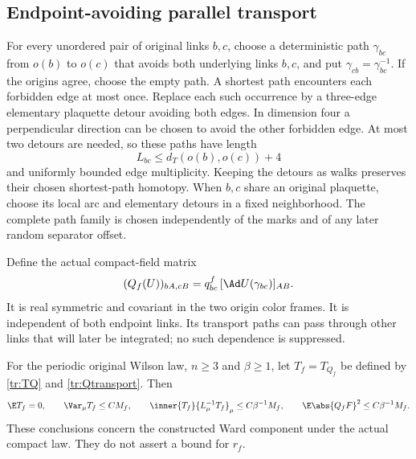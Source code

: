 \subsection{Endpoint-avoiding parallel transport}

For every unordered pair of original links \(b,c\), choose a deterministic
path \(\gamma_{bc}\) from \(o(b)\) to \(o(c)\) that avoids both underlying
links \(b,c\), and put \(\gamma_{cb}=\gamma_{bc}^{-1}\). If the origins agree,
choose the empty path. A shortest path encounters each forbidden edge at most
once. Replace each such occurrence by a three-edge elementary plaquette
detour avoiding both edges. In dimension four a perpendicular direction can
be chosen to avoid the other forbidden edge. At most two detours are needed,
so these paths have length
\begin{equation}
 L_{bc}\le d_T(o(b),o(c))+4
 \label{tr:pathlength}
\end{equation}
and uniformly bounded edge multiplicity. Keeping the detours as walks
preserves their chosen shortest-path homotopy. When \(b,c\) share an original
plaquette, choose its local arc and elementary detours in a fixed neighborhood.
The complete path family is chosen independently of the marks and of any
later random separator offset.

Define the actual compact-field matrix
\begin{equation}
 (Q_f(U))_{bA,cB}
    =q^f_{bc}\,[\Ad U(\gamma_{bc})]_{AB}.
 \label{tr:Qtransport}
\end{equation}
It is real symmetric and covariant in the two origin color frames. It is
independent of both endpoint links. Its transport paths can pass through
other links that will later be integrated; no such dependence is suppressed.

\begin{theorem}
\label{tr:ward}
For the periodic original Wilson law, \(n\ge3\) and \(\beta\ge1\), let
\(T_f=T_{Q_f}\) be defined by \eqref{tr:TQ} and
\eqref{tr:Qtransport}. Then
\begin{equation}
 \E T_f=0,\qquad
 \Var_\mu T_f\le CM_f,\qquad
 \inner{T_f}{L_\mu^{-1}T_f}_\mu\le C\beta^{-1}M_f,
 \qquad \E\abs{Q_fF}^2\le C\beta^{-1}M_f.
 \label{tr:wardbounds}
\end{equation}
These conclusions concern the constructed Ward component under the actual
compact law. They do not assert a bound for \(r_f\).
\end{theorem}

